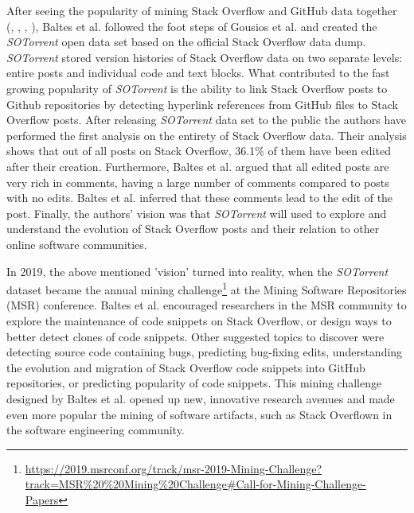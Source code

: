         After seeing the popularity of mining Stack Overflow and GitHub data together (\cite{vasilescu2013stackoverflow}, \cite{lee2017github}, \cite{badashian2014involvement}, \cite{yang2017stack}), Baltes et al. \cite{baltes2018sotorrent} followed the foot steps of Gousios et al. \cite{gousios2013ghtorent} and created the \emph{SOTorrent} open data set based on the official Stack Overflow data dump. \emph{SOTorrent} stored version histories of Stack Overflow data on two separate levels: entire posts and individual code and text blocks. What contributed to the fast growing popularity of \emph{SOTorrent} is the ability to link Stack Overflow posts to Github repositories by detecting hyperlink references from GitHub files to Stack Overflow posts. After releasing \emph{SOTorrent} data set to the public the authors have performed the first analysis on the entirety of Stack Overflow data. Their analysis shows that out of all posts on Stack Overflow, 36.1\% of them have been edited after their creation. Furthermore, Baltes et al. argued that all edited posts are very rich in comments, having a large number of comments compared to posts with no edits. Baltes et al. inferred that these comments lead to the edit of the post.
        Finally, the authors' vision was that \emph{SOTorrent} will used to explore and understand the evolution of Stack Overflow posts and their relation to other online software communities.
        
        In 2019, the above mentioned 'vision' turned into reality, when the \emph{SOTorrent} dataset became the annual mining challenge\footnote{\url{https://2019.msrconf.org/track/msr-2019-Mining-Challenge?track=MSR\%20\%20Mining\%20Challenge\#Call-for-Mining-Challenge-Papers}} at the Mining Software Repositories (MSR) conference. Baltes et al. \cite{baltes2019sotorrent} encouraged researchers in the MSR community to explore the maintenance of code snippets on Stack Overflow, or design ways to better detect clones of code snippets. Other suggested topics to discover were detecting source code containing bugs, predicting bug-fixing edits, understanding the evolution and migration of Stack Overflow code snippets into GitHub repositories, or predicting popularity of code snippets. This mining challenge designed by Baltes et al. \cite{baltes2019sotorrent} opened up new, innovative research avenues and made even more popular the mining of software artifacts, such as Stack Overflown in the software engineering community. 
        
